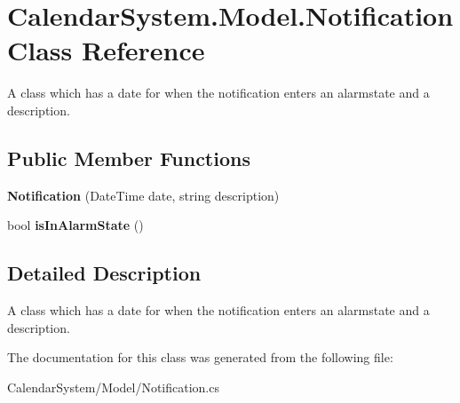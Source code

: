 \hypertarget{class_calendar_system_1_1_model_1_1_notification}{\section{Calendar\+System.\+Model.\+Notification Class Reference}
\label{class_calendar_system_1_1_model_1_1_notification}
}


A class which has a date for when the notification enters an alarmstate and a description.  


\subsection*{Public Member Functions}
\begin{DoxyCompactItemize}
\item 
\hypertarget{class_calendar_system_1_1_model_1_1_notification_a802f3c38e95194ced78a5b707ac26899}{{\bfseries Notification} (Date\+Time date, string description)}\label{class_calendar_system_1_1_model_1_1_notification_a802f3c38e95194ced78a5b707ac26899}

\item 
\hypertarget{class_calendar_system_1_1_model_1_1_notification_ab3ebc86292f1f4382f85c72fce000125}{bool {\bfseries is\+In\+Alarm\+State} ()}\label{class_calendar_system_1_1_model_1_1_notification_ab3ebc86292f1f4382f85c72fce000125}

\end{DoxyCompactItemize}


\subsection{Detailed Description}
A class which has a date for when the notification enters an alarmstate and a description. 



The documentation for this class was generated from the following file\+:\begin{DoxyCompactItemize}
\item 
Calendar\+System/\+Model/Notification.\+cs\end{DoxyCompactItemize}
